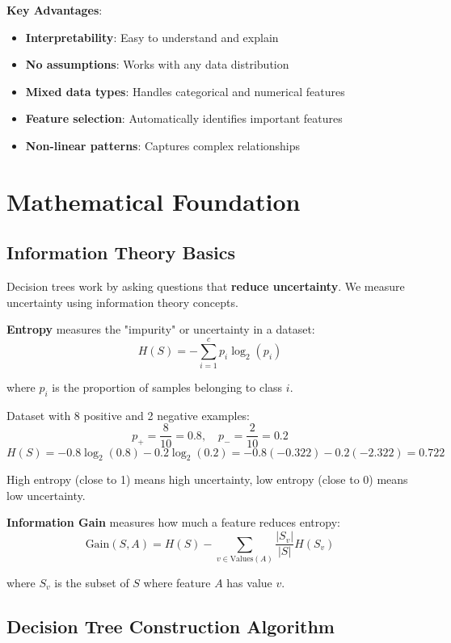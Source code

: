 \documentclass{article}
\newcounter{example}
\begin{document}
\textbf{Key Advantages}:
\begin{itemize}
    \item \textbf{Interpretability}: Easy to understand and explain
    \item \textbf{No assumptions}: Works with any data distribution
    \item \textbf{Mixed data types}: Handles categorical and numerical features
    \item \textbf{Feature selection}: Automatically identifies important features
    \item \textbf{Non-linear patterns}: Captures complex relationships
\end{itemize}

\section{Mathematical Foundation}

\subsection{Information Theory Basics}

Decision trees work by asking questions that \textbf{reduce uncertainty}. We measure uncertainty using information theory concepts.

\textbf{Entropy} measures the "impurity" or uncertainty in a dataset:
$$H(S) = -\sum_{i=1}^c p_i \log_2(p_i)$$

where $p_i$ is the proportion of samples belonging to class $i$.

\begin{tcolorbox}[colback=blue!5!white,colframe=blue!75!black,title=Example \stepcounter{example}\#\theexample: Calculating Entropy]
Dataset with 8 positive and 2 negative examples:
$$p_+ = \frac{8}{10} = 0.8, \quad p_- = \frac{2}{10} = 0.2$$
$$H(S) = -0.8 \log_2(0.8) - 0.2 \log_2(0.2) = -0.8(-0.322) - 0.2(-2.322) = 0.722$$

High entropy (close to 1) means high uncertainty, low entropy (close to 0) means low uncertainty.
\end{tcolorbox}

\textbf{Information Gain} measures how much a feature reduces entropy:
$$\text{Gain}(S, A) = H(S) - \sum_{v \in \text{Values}(A)} \frac{|S_v|}{|S|} H(S_v)$$

where $S_v$ is the subset of $S$ where feature $A$ has value $v$.

\subsection{Decision Tree Construction Algorithm}
\end{document}
